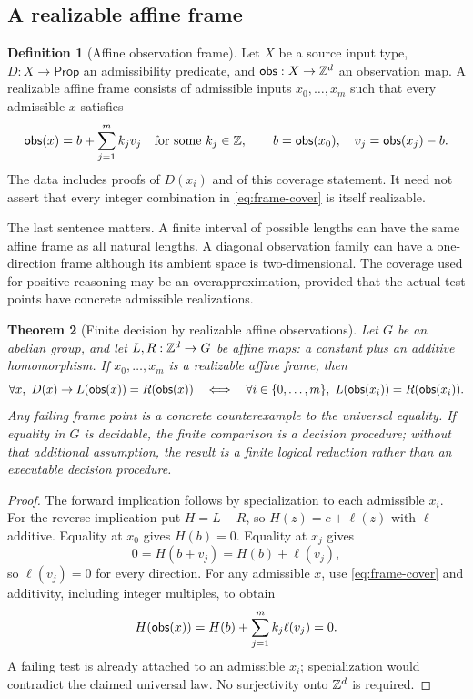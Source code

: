 \documentclass[11pt,a4paper]{article}
\theoremstyle{plain}
\newtheorem{theorem}{Theorem}[section]
\theoremstyle{definition}
\newtheorem{definition}[theorem]{Definition}
\theoremstyle{remark}
\begin{document}
\subsection{A realizable affine frame}
\begin{definition}[Affine observation frame]\label{def:frame}
Let $X$ be a source input type, $D:X\to\mathsf{Prop}$ an admissibility predicate, and $\mathsf{obs}:X\to\mathbb Z^d$ an observation map. A realizable affine frame consists of admissible inputs $x_0,\ldots,x_m$ such that every admissible $x$ satisfies
\begin{equation}\label{eq:frame-cover}
 \mathsf{obs}(x)=b+\sum_{j=1}^m k_jv_j
 \quad\text{for some }k_j\in\mathbb Z,
 \qquad b=\mathsf{obs}(x_0),\quad v_j=\mathsf{obs}(x_j)-b.
\end{equation}
The data includes proofs of $D(x_i)$ and of this coverage statement. It need not assert that every integer combination in \eqref{eq:frame-cover} is itself realizable.
\end{definition}
The last sentence matters. A finite interval of possible lengths can have the same affine frame as all natural lengths. A diagonal observation family can have a one-direction frame although its ambient space is two-dimensional. The coverage used for positive reasoning may be an overapproximation, provided that the actual test points have concrete admissible realizations.

\begin{theorem}[Finite decision by realizable affine observations]\label{thm:frame}
Let $G$ be an abelian group, and let $L,R:\mathbb Z^d\to G$ be affine maps: a constant plus an additive homomorphism. If $x_0,\ldots,x_m$ is a realizable affine frame, then
\[
 \forall x,\ D(x)\to L(\mathsf{obs}(x))=R(\mathsf{obs}(x))
 \quad\Longleftrightarrow\quad
 \forall i\in\{0,\ldots,m\},\ L(\mathsf{obs}(x_i))=R(\mathsf{obs}(x_i)).
\]
Any failing frame point is a concrete counterexample to the universal equality. If equality in $G$ is decidable, the finite comparison is a decision procedure; without that additional assumption, the result is a finite logical reduction rather than an executable decision procedure.
\end{theorem}
\begin{proof}
The forward implication follows by specialization to each admissible $x_i$. For the reverse implication put $H=L-R$, so $H(z)=c+\ell(z)$ with $\ell$ additive. Equality at $x_0$ gives $H(b)=0$. Equality at $x_j$ gives
\[
 0=H(b+v_j)=H(b)+\ell(v_j),
\]
so $\ell(v_j)=0$ for every direction. For any admissible $x$, use \eqref{eq:frame-cover} and additivity, including integer multiples, to obtain
\[
 H(\mathsf{obs}(x))=H(b)+\sum_{j=1}^m k_j\ell(v_j)=0.
\]
A failing test is already attached to an admissible $x_i$; specialization would contradict the claimed universal law. No surjectivity onto $\mathbb Z^d$ is required.
\end{proof}
\end{document}
